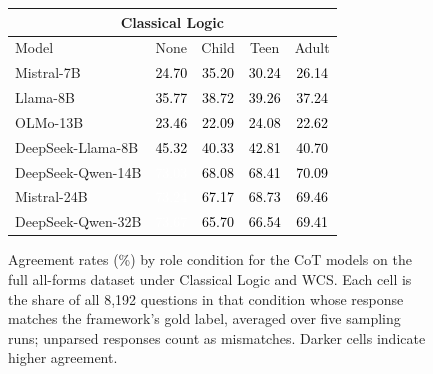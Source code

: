 \begin{figure}[H]
\centering
\caption{Agreement rates (\%) by role condition for the CoT models on the full all-forms dataset under Classical Logic and WCS. Each cell is the share of all 8,192 questions in that condition whose response matches the framework's gold label, averaged over five sampling runs; unparsed responses count as mismatches. Darker cells indicate higher agreement.}
\label{fig:role-heatmap-final2}
\small
\begin{tabular}{lcccc}
\multicolumn{5}{c}{\textbf{Classical Logic}} \\
\toprule
Model & None & Child & Teen & Adult \\
\midrule
Mistral-7B & \cellcolor[HTML]{CEDDD2}\textcolor{black}{24.70} & \cellcolor[HTML]{BBD0C0}\textcolor{black}{35.20} & \cellcolor[HTML]{C4D6C9}\textcolor{black}{30.24} & \cellcolor[HTML]{CCDCD0}\textcolor{black}{26.14} \\
Llama-8B & \cellcolor[HTML]{B9CEBE}\textcolor{black}{35.77} & \cellcolor[HTML]{B3CAB9}\textcolor{black}{38.72} & \cellcolor[HTML]{B3CAB9}\textcolor{black}{39.26} & \cellcolor[HTML]{B7CDBC}\textcolor{black}{37.24} \\
OLMo-13B & \cellcolor[HTML]{D2E0D6}\textcolor{black}{23.46} & \cellcolor[HTML]{D4E1D7}\textcolor{black}{22.09} & \cellcolor[HTML]{D0DFD4}\textcolor{black}{24.08} & \cellcolor[HTML]{D2E0D6}\textcolor{black}{22.62} \\
DeepSeek-Llama-8B & \cellcolor[HTML]{A7C2AE}\textcolor{black}{45.32} & \cellcolor[HTML]{B1C9B7}\textcolor{black}{40.33} & \cellcolor[HTML]{ABC5B2}\textcolor{black}{42.81} & \cellcolor[HTML]{AFC8B5}\textcolor{black}{40.70} \\
DeepSeek-Qwen-14B & \cellcolor[HTML]{719C7C}\textcolor{white}{73.03} & \cellcolor[HTML]{7AA385}\textcolor{black}{68.08} & \cellcolor[HTML]{7AA385}\textcolor{black}{68.41} & \cellcolor[HTML]{76A081}\textcolor{black}{70.09} \\
Mistral-24B & \cellcolor[HTML]{719C7C}\textcolor{white}{73.24} & \cellcolor[HTML]{7CA586}\textcolor{black}{67.17} & \cellcolor[HTML]{78A283}\textcolor{black}{68.73} & \cellcolor[HTML]{78A283}\textcolor{black}{69.46} \\
DeepSeek-Qwen-32B & \cellcolor[HTML]{6F9B7A}\textcolor{white}{73.67} & \cellcolor[HTML]{7EA688}\textcolor{black}{65.70} & \cellcolor[HTML]{7CA586}\textcolor{black}{66.54} & \cellcolor[HTML]{78A283}\textcolor{black}{69.41} \\
\bottomrule

\end{tabular}
\end{figure}
